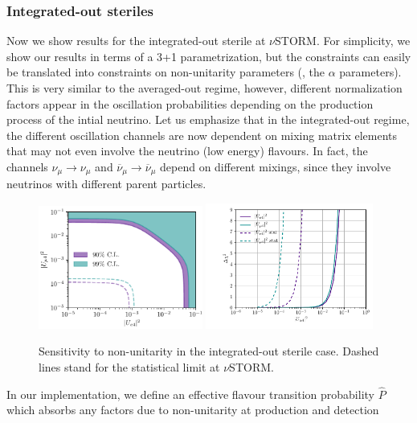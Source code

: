\subsubsection{Integrated-out steriles}

Now we show results for the integrated-out sterile at $\nu$STORM. For simplicity, we show our results in terms of a 3+1 parametrization, but the constraints can easily be translated into constraints on non-unitarity parameters (\eg, the $\alpha$ parameters). This is very similar to the averaged-out regime, however, different normalization factors appear in the oscillation probabilities depending on the production process of the intial neutrino. Let us emphasize that in the integrated-out regime, the different oscillation channels are now dependent on mixing matrix elements that may not even involve the neutrino (low energy) flavours. In fact, the channels $\nu_{\mu} \to \nu_{\mu}$ and $\overline{\nu}_{\mu} \to \overline{\nu}_{\mu}$ depend on different mixings, since they involve neutrinos with different parent particles.
%
\begin{figure}
\includegraphics[width=0.48\textwidth]{figs/MUV_joined.pdf}
\includegraphics[width=0.49\textwidth]{figs/MUV_1D.pdf}
\caption[Sensitivity to non-unitarity in the integrated-out sterile case.]{Sensitivity to non-unitarity in the integrated-out sterile case. Dashed lines stand for the statistical limit at $\nu$STORM. \label{fig:non-uni}}
\end{figure}
%
In our implementation, we define an effective flavour transition probability $\hat{P}$ which absorbs any factors due to non-unitarity at production and detection
